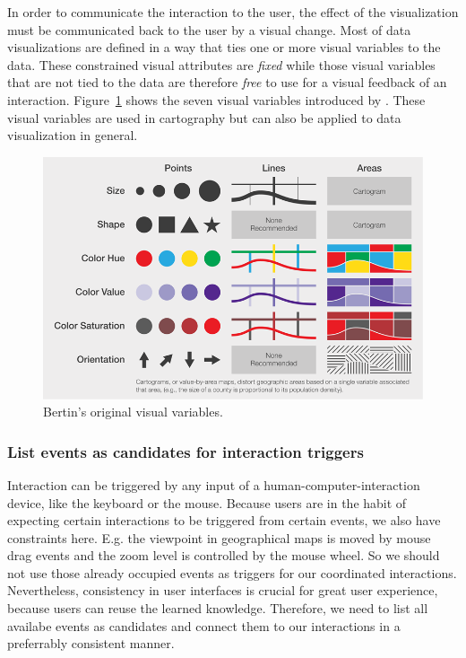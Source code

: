 \documentclass{article}
\begin{document}
In order to communicate the interaction to the user, the effect of the visualization must be communicated back to the user by a visual change.
Most of data visualizations are defined in a way that ties one or more visual variables to the data.
These constrained visual attributes are \emph{fixed} while those visual variables that are not tied to the data are therefore \emph{free} to use for a visual feedback of an interaction.
Figure~\ref{fig:concept:visual-variables} shows the seven visual variables introduced by \textcite{Bertin2010}.
These visual variables are used in cartography but can also be applied to data visualization in general.
\begin{figure}[h!]
  \centering
  \includegraphics[width=\textwidth]{images/visual-variables.png}
  \caption{Bertin's\cite{Bertin2010} original visual variables.}
  \label{fig:concept:visual-variables}
\end{figure}

\subsubsection{List events as candidates for interaction triggers}

Interaction can be triggered by any input of a human-computer-interaction device, like the keyboard or the mouse.
Because users are in the habit of expecting certain interactions to be triggered from certain events, we also have constraints here.
E.g. the viewpoint in geographical maps is moved by mouse drag events and the zoom level is controlled by the mouse wheel.
So we should not use those already occupied events as triggers for our coordinated interactions.
Nevertheless, consistency in user interfaces is crucial for great user experience, because users can reuse the learned knowledge.
Therefore, we need to list all availabe events as candidates and connect them to our interactions in a preferrably consistent manner.
\end{document}
